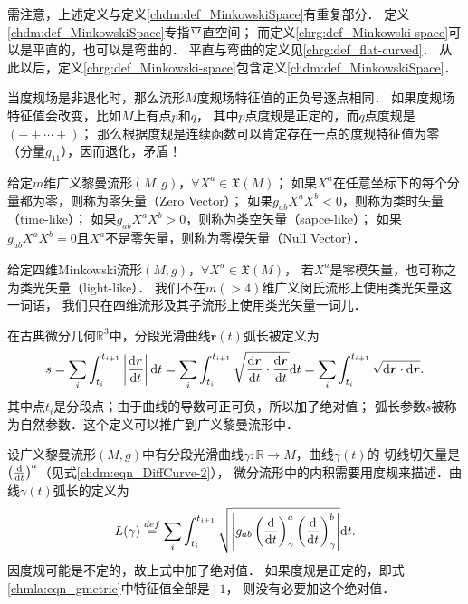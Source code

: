 {\kaishu 需注意，上述定义与定义\ref{chdm:def_MinkowskiSpace}有重复部分．
定义\ref{chdm:def_MinkowskiSpace}专指平直空间；
而定义\ref{chrg:def_Minkowski-space}可以是平直的，也可以是弯曲的．
平直与弯曲的定义见\ref{chrg:def_flat-curved}．
从此以后，定义\ref{chrg:def_Minkowski-space}包含定义\ref{chdm:def_MinkowskiSpace}．}

当度规场是非退化时，那么流形$M$度规场特征值的正负号逐点相同．
如果度规场特征值会改变，比如$M$上有点$p$和$q$，
其中$p$点度规是正定的，而$q$点度规是$(-+\cdots+)$；
那么根据度规是连续函数可以肯定存在一点的度规特征值为零（分量$g_{11}$），因而退化，矛盾！

\begin{definition}\label{chrg:def_vector-property}
    给定$m$维广义黎曼流形$(M,g)$，$\forall X^a \in \mathfrak{X}(M)$；
    如果$X^a$在任意坐标下的每个分量都为零，则称为{\heiti 零矢量}（Zero Vector）；
    如果$g_{ab}X^a X^b<0$，则称为{\heiti 类时矢量}（time-like）；
    如果$g_{ab}X^a X^b>0$，则称为{\heiti 类空矢量}（sapce-like）；
    如果$g_{ab}X^a X^b=0$且$X^a$不是零矢量，则称为{\heiti 零模矢量}（Null Vector）．
\end{definition}

\begin{definition}
    给定{\heiti 四维}Minkowski流形$(M,g)$，$\forall X^a \in \mathfrak{X}(M)$，
    若$X^a$是零模矢量，也可称之为{\heiti 类光矢量}（light-like）．
    我们不在$m(>4)$维广义闵氏流形上使用类光矢量这一词语，
    我们只在四维流形及其子流形上使用类光矢量一词儿．
\end{definition}


在古典微分几何$\mathbb{R}^3$中，分段光滑曲线$\boldsymbol{r}(t)$弧长被定义为
\begin{equation*}
    s=\sum_{i} \int_{t_i}^{t_{i+1}} \left|\frac{{\rm d}\boldsymbol{r}}{{\rm d}t}\right| {\rm d} t
    =\sum_{i} \int_{t_i}^{t_{i+1}} \sqrt{\frac{{\rm d}\boldsymbol{r}}{{\rm d}t}\cdot
        \frac{{\rm d}\boldsymbol{r}}{{\rm d}t} } {\rm d} t
    =\sum_{i} \int_{t_i}^{t_{i+1}} \sqrt{{\rm d}\boldsymbol{r}\cdot{\rm d}\boldsymbol{r} }.
\end{equation*}
其中点${t_i}$是分段点；由于曲线的导数可正可负，所以加了绝对值；
弧长参数$s$被称为{\heiti 自然参数}．这个定义可以推广到广义黎曼流形中．


设广义黎曼流形$(M,g)$中有分段光滑曲线$\gamma:\mathbb{R}\to M$，曲线$\gamma(t)$的
切线切矢量是$\left(\frac{{\rm d}  }{{\rm d} t}\right)^a$（见式\eqref{chdm:eqn_DiffCurve-2}），
微分流形中的内积需要用度规来描述．曲线$\gamma(t)${\heiti 弧长}的定义为
\begin{equation}\label{chrg:eqn_arc-length}
    L(\gamma)\overset{def}{=}\sum_{i} \int_{t_i}^{t_{i+1}} \sqrt{\left| g_{ab} \left(\frac{{\rm d}  }
        {{\rm d} t}\right)^a_{\gamma}\left(\frac{{\rm d}  }{{\rm d} t}\right)^b_{\gamma}\right|} {\rm d}t .
\end{equation}
因度规可能是不定的，故上式中加了绝对值．
如果度规是正定的，即式\eqref{chmla:eqn_gmetric}中特征值全部是$+1$，
则没有必要加这个绝对值．

